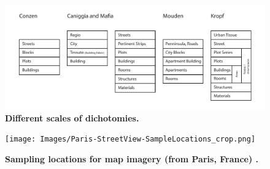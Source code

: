 \documentclass{article}
\begin{document}
\begin{figure}
\centering    
\includegraphics[scale=0.80,page=1]{Images/Typology_Dichtomies.pdf}  
\caption{\bf Different scales of dichotomies. }    
 \label{fig:TypologyDichtomies}  
\end{figure} 

\begin{figure}
    \centering    
\texttt{[image: Images/Paris-StreetView-SampleLocations\_crop.png]}  
\caption{\bf Sampling locations for map imagery (from Paris, France) \cite{GoogleStatic2017}.}    
 \label{fig:parissample}  
\end{figure} 
\end{document}
